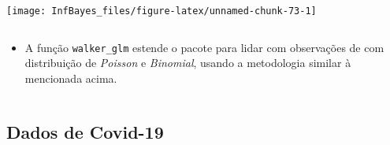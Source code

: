 \documentclass[
]{book}
\providecommand{\tightlist}{%
  \setlength{\itemsep}{0pt}\setlength{\parskip}{0pt}}
\begin{document}
\begin{center}\texttt{[image: InfBayes\_files/figure-latex/unnamed-chunk-73-1]} \end{center}

\(~\)

\begin{itemize}
\tightlist
\item
  A função \texttt{walker\_glm} estende o pacote para lidar com observações de com distribuição de \emph{Poisson} e \emph{Binomial}, usando a metodologia similar à mencionada acima.
\end{itemize}

\(~\)

\hypertarget{dados-de-covid-19}{%
\subsection{Dados de Covid-19}\label{dados-de-covid-19}}
\end{document}
